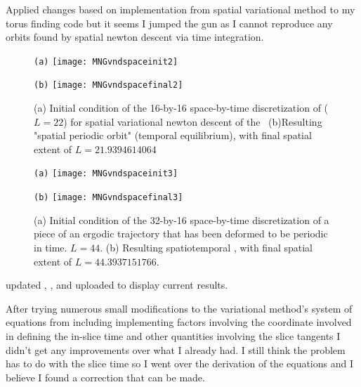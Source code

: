 Applied changes based on implementation from spatial variational method to my torus finding code but it seems
I jumped the gun as I cannot reproduce any orbits found by spatial {newton descent} via time integration.

\begin{figure}[ht]
\begin{minipage}[height=.32\textheight]{.45\textwidth}
\centering \small{\texttt{(a)}}
\texttt{[image: MNGvndspaceinit2]}
\end{minipage}
\begin{minipage}[height=.32\textheight]{.45\textwidth}
\centering \small{\texttt{(b)}}
\texttt{[image: MNGvndspacefinal2]}
\end{minipage}
\caption{ \label{fig:MNGvndspace2}
(a) Initial condition of the 16-by-16 space-by-time discretization of  ($L=22$) for spatial
variational {newton descent} of the \KSe\ (b)Resulting "spatial periodic orbit" (temporal equilibrium), with
final spatial extent of $L = 21.9394614064$
}
\end{figure}
\begin{figure}[ht]
\begin{minipage}[height=.32\textheight]{.45\textwidth}
\centering \small{\texttt{(a)}}
\texttt{[image: MNGvndspaceinit3]}
\end{minipage}
\begin{minipage}[height=.32\textheight]{.45\textwidth}
\centering \small{\texttt{(b)}}
\texttt{[image: MNGvndspacefinal3]}
\end{minipage}
\caption{ \label{fig:MNGvndspace3}
(a) Initial condition of the 32-by-16 space-by-time discretization of a piece
of an ergodic trajectory that has been deformed to be periodic in time. $L=44$.
(b) Resulting spatiotemporal \po, with
final spatial extent of $L = 44.3937151766$.
}
\end{figure}


updated , , and uploaded  to display
current results.

After trying numerous small modifications to the variational method's system
of equations from  including implementing factors involving
the coordinate involved in defining the in-slice time and other quantities
involving the slice tangents I didn't get any improvements over what I already
had. I still think the problem has to do with the slice time so I went over
the derivation of the equations and I believe I found a correction that can be
made.

